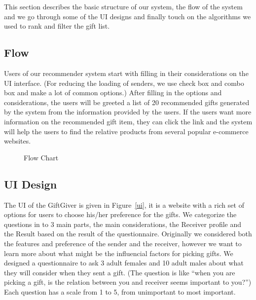 \documentclass[11pt,twocolumn]{article}
\begin{document}
This section describes the basic structure of our system, the flow of the system and we go through some of the UI designs and finally touch on the algorithms we used to rank and filter the gift list.

\subsection{Flow}
Users of our recommender system start with filling in their considerations on the UI interface. (For reducing the loading of senders, we use check box and combo box and make a lot of common options.)   
After filling in the options and considerations, the users will be greeted  a list of 20 recommended gifts generated by the system from the information provided by the users.
If the users want more information on the recommended gift item, they can click the link and the system will help the users to find the relative products from several popular e-commerce websites.

\begin{figure}[h!t]
\caption{Flow Chart}
\end{figure}


\subsection{UI Design}
The UI of the GiftGiver is given in Figure~\ref{ui}, it is a website with a rich set of options for users to choose his/her preference for the gifts. We categorize the questions in to 3 main parts, the main considerations, the Receiver profile and the Result based on the result of the questionnaire. Originally we considered both the features and preference of the sender and the receiver, however we want to learn more about what might be the influencial factors for picking gifts.  We designed a questionnaire to ask 3 adult females and 10 adult males about what they will consider when they sent a gift.
(The question is like “when you are picking a gift, is the relation between you and receiver seems important to you?”)   Each question has a scale from 1 to 5, from unimportant to most important.
\end{document}
